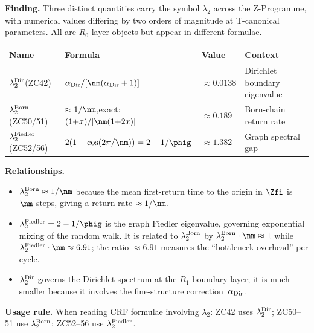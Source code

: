 \documentclass[12pt, a4paper]{article}
\begin{document}
\begin{derivedbox}[title={FIND-ZC56-03: Three Distinct $\lambda_2$
  Concepts in CRF --- Taxonomy Map ($R_0$)}]
\textbf{Finding.}
Three distinct quantities carry the symbol $\lambda_2$ across
the Z-Programme, with numerical values differing by two orders
of magnitude at T-canonical parameters.  All are $R_0$-layer
objects but appear in different formulae.

\begin{center}
\renewcommand{\arraystretch}{1.4}
\begin{tabular}{@{}p{2.4cm}p{3.6cm}p{2.8cm}p{2.4cm}@{}}
\toprule
\textbf{Name} & \textbf{Formula} & \textbf{Value} & \textbf{Context} \\
\midrule
$\lambda_2^{\rm Dir}$\newline(ZC42) &
  $\alpha_{\rm Dir}/[\nm(\alpha_{\rm Dir}+1)]$ &
  $\approx0.0138$ &
  Dirichlet boundary eigenvalue \\[4pt]
$\lambda_2^{\rm Born}$\newline(ZC50/51) &
  $\approx1/\nm$,\newline exact: $(1{+}x)/[\nm(1{+}2x)]$ &
  $\approx0.189$ &
  Born-chain return rate \\[4pt]
$\lambda_2^{\rm Fiedler}$\newline(ZC52/56) &
  $2(1-\cos(2\pi/\nm))=2-1/\phig$ &
  $\approx1.382$ &
  Graph spectral gap \\
\bottomrule
\end{tabular}
\end{center}

\medskip
\textbf{Relationships.}
\begin{itemize}[leftmargin=2em, noitemsep]
\item $\lambda_2^{\rm Born}\approx1/\nm$ because the mean
  first-return time to the origin in $\Zfi$ is $\nm$ steps,
  giving a return rate $\approx1/\nm$.
\item $\lambda_2^{\rm Fiedler}=2-1/\phig$ is the graph Fiedler
  eigenvalue, governing exponential mixing of the random walk.
  It is related to $\lambda_2^{\rm Born}$ by
  $\lambda_2^{\rm Born}\cdot\nm\approx1$ while
  $\lambda_2^{\rm Fiedler}\cdot\nm\approx6.91$; the ratio
  $\approx6.91$ measures the ``bottleneck overhead'' per cycle.
\item $\lambda_2^{\rm Dir}$ governs the Dirichlet spectrum
  at the $R_1$ boundary layer; it is much smaller because
  it involves the fine-structure correction~$\alpha_{\rm Dir}$.
\end{itemize}

\medskip
\textbf{Usage rule.}  When reading CRF formulae involving $\lambda_2$:
ZC42 uses $\lambda_2^{\rm Dir}$; ZC50--51 use $\lambda_2^{\rm Born}$;
ZC52--56 use $\lambda_2^{\rm Fiedler}$.
\end{derivedbox}
\end{document}
